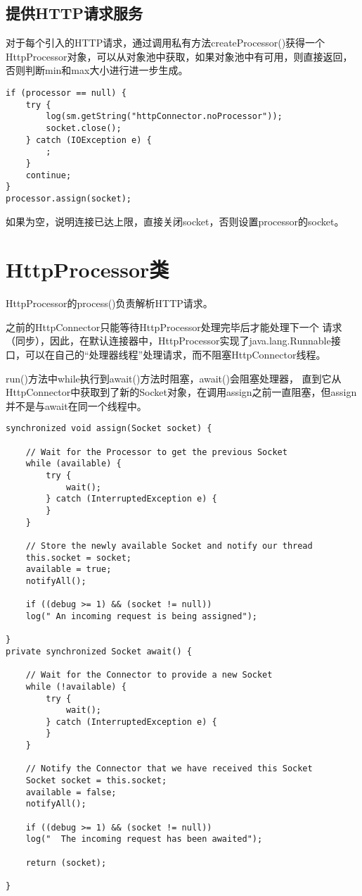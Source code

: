 \subsection{提供HTTP请求服务}
对于每个引入的HTTP请求，通过调用私有方法createProcessor()获得一个HttpProcessor对象，可以从对象池中获取，如果对象池中有可用，则直接返回，否则判断min和max大小进行进一步生成。
\begin{lstlisting}
if (processor == null) {
	try {
		log(sm.getString("httpConnector.noProcessor"));
		socket.close();
	} catch (IOException e) {
		;
	}
	continue;
}
processor.assign(socket);
\end{lstlisting}
如果为空，说明连接已达上限，直接关闭socket，否则设置processor的socket。
\section{HttpProcessor类}
HttpProcessor的process()负责解析HTTP请求。
\par 之前的HttpConnector只能等待HttpProcessor处理完毕后才能处理下一个
请求（同步），因此，在默认连接器中，HttpProcessor实现了java.lang.Runnable接口，可以在自己的“处理器线程”处理请求，而不阻塞HttpConnector线程。
\par run()方法中while执行到await()方法时阻塞，await()会阻塞处理器，
直到它从HttpConnector中获取到了新的Socket对象，在调用assign之前一直阻塞，但assign并不是与await在同一个线程中。
\begin{lstlisting}
synchronized void assign(Socket socket) {
	
	// Wait for the Processor to get the previous Socket
	while (available) {
		try {
			wait();
		} catch (InterruptedException e) {
		}
	}
	
	// Store the newly available Socket and notify our thread
	this.socket = socket;
	available = true;
	notifyAll();
	
	if ((debug >= 1) && (socket != null))
	log(" An incoming request is being assigned");
	
}
private synchronized Socket await() {
	
	// Wait for the Connector to provide a new Socket
	while (!available) {
		try {
			wait();
		} catch (InterruptedException e) {
		}
	}
	
	// Notify the Connector that we have received this Socket
	Socket socket = this.socket;
	available = false;
	notifyAll();
	
	if ((debug >= 1) && (socket != null))
	log("  The incoming request has been awaited");
	
	return (socket);
	
}
\end{lstlisting}
